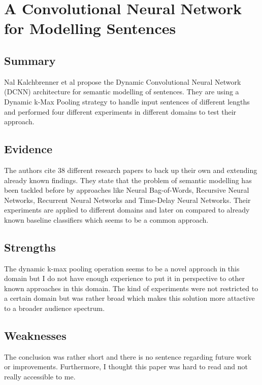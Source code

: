 \documentclass[a4paper]{article}
\begin{document}
\section{A Convolutional Neural Network for Modelling Sentences}

\subsection{Summary}

Nal Kalchbrenner et al propose the Dynamic Convolutional Neural Network (DCNN) architecture for semantic modelling of sentences. They are using a Dynamic k-Max Pooling strategy to handle input sentences of different lengths and performed four different experiments in different domains to test their approach.

\subsection{Evidence}

The authors cite 38 different research papers to back up their own and extending already known findings. They state that the problem of semantic modelling has been tackled before by approaches like Neural Bag-of-Words, Recursive Neural Networks, Recurrent Neural Networks and Time-Delay Neural Networks. Their experiments are applied to different domains and later on compared to already known baseline classifiers which seems to be a common approach.

\subsection{Strengths}

The dynamic k-max pooling operation seems to be a novel approach in this domain but I do not have enough experience to put it in perspective to other known approaches in this domain. The kind of experiments were not restricted to a certain domain but was rather broad which makes this solution more attactive to a broader audience spectrum.


\subsection{Weaknesses}

The conclusion was rather short and there is no sentence regarding future work or improvements. Furthermore, I thought this paper was hard to read and not really accessible to me.
\end{document}

